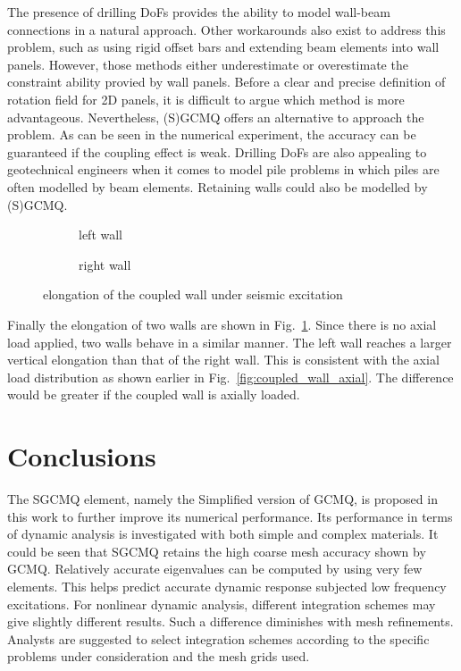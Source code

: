 \documentclass[3p,sort&compress,review,11pt,fleqn]{elsarticle}
\newcommand*{\figref}[1]{Fig.~\ref{#1}}
\begin{document}
The presence of drilling DoFs provides the ability to model wall-beam connections in a natural approach. Other workarounds also exist to address this problem, such as using rigid offset bars and extending beam elements into wall panels. However, those methods either underestimate or overestimate the constraint ability provied by wall panels. Before a clear and precise definition of rotation field for 2D panels, it is difficult to argue which method is more advantageous. Nevertheless, (S)GCMQ offers an alternative to approach the problem. As can be seen in the numerical experiment, the accuracy can be guaranteed if the coupling effect is weak. Drilling DoFs are also appealing to geotechnical engineers when it comes to model pile problems in which piles are often modelled by beam elements. Retaining walls could also be modelled by (S)GCMQ.

\begin{figure}[htb]
\centering\scriptsize
\begin{subfigure}{.49\textwidth}\centering

\caption{left wall}
\end{subfigure}\hfill
\begin{subfigure}{.49\textwidth}\centering

\caption{right wall}
\end{subfigure}
\caption{elongation of the coupled wall under seismic excitation}\label{fig:coupled_elongation}
\end{figure}
Finally the elongation of two walls are shown in \figref{fig:coupled_elongation}. Since there is no axial load applied, two walls behave in a similar manner. The left wall reaches a larger vertical elongation than that of the right wall. This is consistent with the axial load distribution as shown earlier in \figref{fig:coupled_wall_axial}. The difference would be greater if the coupled wall is axially loaded.
\section{Conclusions}
The SGCMQ element, namely the Simplified version of GCMQ, is proposed in this work to further improve its numerical performance. Its performance in terms of dynamic analysis is investigated with both simple and complex materials. It could be seen that SGCMQ retains the high coarse mesh accuracy shown by GCMQ. Relatively accurate eigenvalues can be computed by using very few elements. This helps predict accurate dynamic response subjected low frequency excitations. For nonlinear dynamic analysis, different integration schemes may give slightly different results. Such a difference diminishes with mesh refinements. Analysts are suggested to select integration schemes according to the specific problems under consideration and the mesh grids used.
\end{document}
